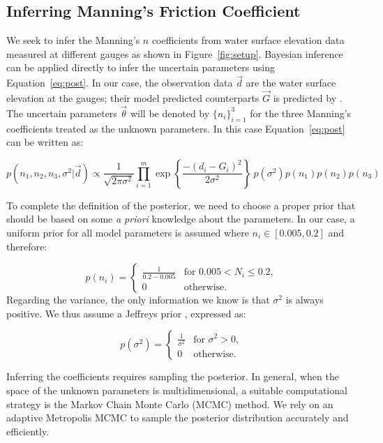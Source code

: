 \subsection{Inferring Manning's Friction Coefficient}
 \label{sec:manning}
 
We seek to infer the Manning's $n$ coefficients from water surface elevation
data measured at different gauges as shown in Figure~\ref{fig:setup}.
Bayesian inference can be applied directly to infer the uncertain parameters
using Equation~\eqref{eq:post}. In our case, the observation data $\vec d$ 
are the water surface elevation at the gauges;
their model predicted counterparts $\vec G$ is predicted by \geoclaw.
The uncertain parameters $\vec \theta$ will be denoted by $\{n_i\}_{i=1}^3$ for the
three Manning's coefficients treated as the unknown parameters. 
In this case  Equation~\eqref{eq:post} can be written as:

\begin{equation} 
p(n_1,n_2,n_3,\sigma^2 | \vec d) 
\propto \frac{1}{\sqrt{2 \pi \sigma^2}} 
 \prod_{i=1}^m  
\exp \left\lbrace \frac{-(d_i - G_i)^2}{2 \sigma^2} \right\rbrace
\ p(\sigma^2)p(n_1)p(n_2) p(n_3)
\label{eq:post_coef}
\end{equation}

To complete the definition of the posterior, we need to choose a proper prior that should be based 
on some \emph{a priori} knowledge about the parameters. In our case, a uniform
prior for all model parameters is assumed where $n_i \in [0.005,0.2]$ and therefore:

\begin{equation} 
p(n_i) = \begin{cases}
		\displaystyle \frac{1}{0.2-0.005} &\text{for~} 0.005 <  N_i \leq 0.2 ,  \\
		0 &\text{otherwise}  .
\end{cases}
\end{equation}
Regarding the variance, the only information we know 
is that $\sigma^2$ is always positive.
We thus assume a Jeffreys prior \citep{sivia}, expressed as:

\begin{equation} 
p(\sigma^2) =  \begin{cases}
		\displaystyle \frac{1}{\sigma^2} &\text{for~} \sigma^2 > 0,  \\
		0 &\text{otherwise}. 
		\end{cases}
\label{eq:var_pr}
\end{equation}

Inferring the coefficients requires 
sampling the posterior. In general, when the space of the unknown 
parameters is multidimensional, a suitable computational strategy is 
the Markov Chain Monte  Carlo (MCMC) method. 
We rely on an adaptive Metropolis MCMC \citep{Gareth2009,Haario2001} to
sample the posterior distribution accurately and efficiently.


